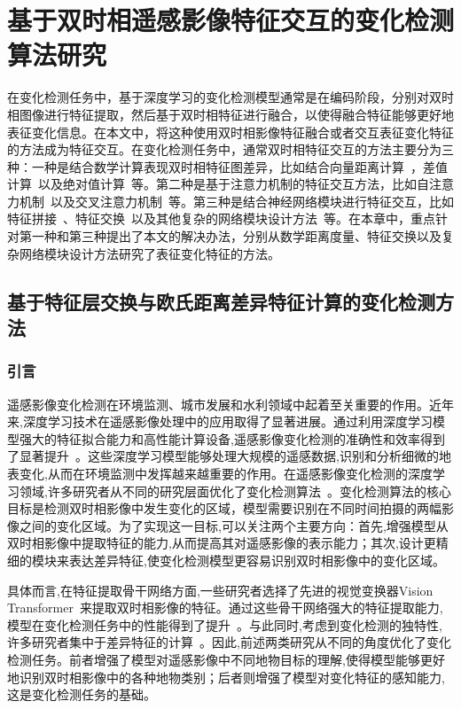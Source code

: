 
\chapter{基于双时相遥感影像特征交互的变化检测算法研究}
在变化检测任务中，基于深度学习的变化检测模型通常是在编码阶段，分别对双时相图像进行特征提取，然后基于双时相特征进行融合，以使得融合特征能够更好地表征变化信息。在本文中，将这种使用双时相影像特征融合或者交互表征变化特征的方法成为特征交互。在变化检测任务中，通常双时相特征交互的方法主要分为三种：一种是结合数学计算表现双时相特征图差异，比如结合向量距离计算~\cite{dong2024changeclip}，差值计算~\cite{h_wei_spatio-temporal_2024}以及绝对值计算~\cite{shi_deeply_2022}等。第二种是基于注意力机制的特征交互方法，比如自注意力机制~\cite{Ying2024DGMA2NetAD}以及交叉注意力机制~\cite{lu_cross_2024}等。第三种是结合神经网络模块进行特征交互，比如特征拼接~\cite{chen2024changemamba}、特征交换~\cite{Fang2022ChangerFI}以及其他复杂的网络模块设计方法~\cite{Zhu2025Change3DRC}等。在本章中，重点针对第一种和第三种提出了本文的解决办法，分别从数学距离度量、特征交换以及复杂网络模块设计方法研究了表征变化特征的方法。

\section{基于特征层交换与欧氏距离差异特征计算的变化检测方法}
\subsection{引言}

遥感影像变化检测在环境监测、城市发展和水利领域中起着至关重要的作用。近年来,深度学习技术在遥感影像处理中的应用取得了显著进展。通过利用深度学习模型强大的特征拟合能力和高性能计算设备,遥感影像变化检测的准确性和效率得到了显著提升~\cite{Chen2021FCCDNFC}。这些深度学习模型能够处理大规模的遥感数据,识别和分析细微的地表变化,从而在环境监测中发挥越来越重要的作用。在遥感影像变化检测的深度学习领域,许多研究者从不同的研究层面优化了变化检测算法~\cite{chen_remote_2022, Fang2022ChangerFI}。变化检测算法的核心目标是检测双时相影像中发生变化的区域，模型需要识别在不同时间拍摄的两幅影像之间的变化区域。为了实现这一目标,可以关注两个主要方向：首先,增强模型从双时相影像中提取特征的能力,从而提高其对遥感影像的表示能力；其次,设计更精细的模块来表达差异特征,使变化检测模型更容易识别双时相影像中的变化区域。

具体而言,在特征提取骨干网络方面,一些研究者选择了先进的视觉变换器Vision Transformer~\cite{Dosovitskiy2020AnII}来提取双时相影像的特征。通过这些骨干网络强大的特征提取能力,模型在变化检测任务中的性能得到了提升~\cite{He2015DeepRL, Gu2023MambaLS, Dosovitskiy2020AnII}。与此同时,考虑到变化检测的独特性,许多研究者集中于差异特征的计算~\cite{dong_changeclip_2024, dong_efficientcd_2024}。因此,前述两类研究从不同的角度优化了变化检测任务。前者增强了模型对遥感影像中不同地物目标的理解,使得模型能够更好地识别双时相影像中的各种地物类别；后者则增强了模型对变化特征的感知能力,这是变化检测任务的基础。


